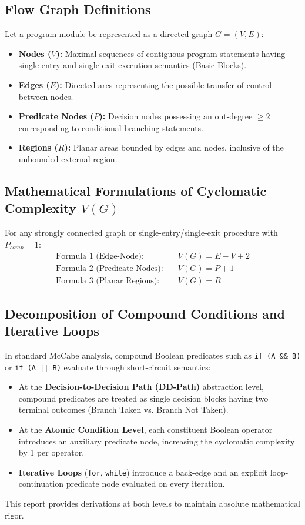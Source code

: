 \documentclass[11pt,a4paper]{article}
\begin{document}
\subsection{Flow Graph Definitions}
Let a program module be represented as a directed graph $G = (V, E)$:
\begin{itemize}
    \item \textbf{Nodes ($V$):} Maximal sequences of contiguous program statements having single-entry and single-exit execution semantics (Basic Blocks).
    \item \textbf{Edges ($E$):} Directed arcs representing the possible transfer of control between nodes.
    \item \textbf{Predicate Nodes ($P$):} Decision nodes possessing an out-degree $\ge 2$ corresponding to conditional branching statements.
    \item \textbf{Regions ($R$):} Planar areas bounded by edges and nodes, inclusive of the unbounded external region.
\end{itemize}

\subsection{Mathematical Formulations of Cyclomatic Complexity $V(G)$}
For any strongly connected graph or single-entry/single-exit procedure with $P_{comp} = 1$:
\begin{align}
    \text{Formula 1 (Edge-Node):} \quad & V(G) = E - V + 2 \label{eq:en}\\
    \text{Formula 2 (Predicate Nodes):} \quad & V(G) = P + 1 \label{eq:pred}\\
    \text{Formula 3 (Planar Regions):} \quad & V(G) = R \label{eq:reg}
\end{align}

\subsection{Decomposition of Compound Conditions and Iterative Loops}
In standard McCabe analysis, compound Boolean predicates such as \texttt{if (A \&\& B)} or \texttt{if (A || B)} evaluate through short-circuit semantics:
\begin{itemize}
    \item At the \textbf{Decision-to-Decision Path (DD-Path)} abstraction level, compound predicates are treated as single decision blocks having two terminal outcomes (Branch Taken vs. Branch Not Taken).
    \item At the \textbf{Atomic Condition Level}, each constituent Boolean operator introduces an auxiliary predicate node, increasing the cyclomatic complexity by 1 per operator.
    \item \textbf{Iterative Loops} (\texttt{for}, \texttt{while}) introduce a back-edge and an explicit loop-continuation predicate node evaluated on every iteration.
\end{itemize}
This report provides derivations at both levels to maintain absolute mathematical rigor.
\end{document}
